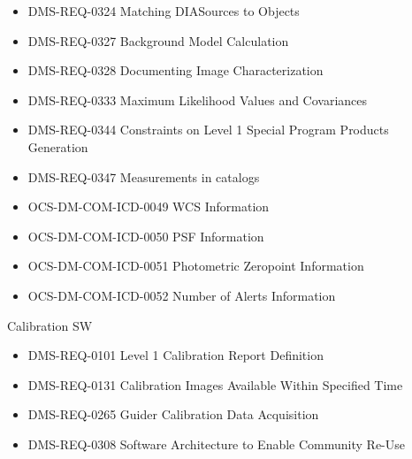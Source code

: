 \begin{itemize}
\item DMS-REQ-0324 Matching DIASources to Objects
\item DMS-REQ-0327 Background Model Calculation
\item DMS-REQ-0328 Documenting Image Characterization
\item DMS-REQ-0333 Maximum Likelihood Values and Covariances
\item DMS-REQ-0344 Constraints on Level 1 Special Program Products Generation
\item DMS-REQ-0347 Measurements in catalogs
\item OCS-DM-COM-ICD-0049 WCS Information
\item OCS-DM-COM-ICD-0050 PSF Information
\item OCS-DM-COM-ICD-0051 Photometric Zeropoint Information
\item OCS-DM-COM-ICD-0052 Number of Alerts Information
\end{itemize}
Calibration SW \begin{itemize}
\item DMS-REQ-0101 Level 1 Calibration Report Definition
\item DMS-REQ-0131 Calibration Images Available Within Specified Time
\item DMS-REQ-0265 Guider Calibration Data Acquisition
\item DMS-REQ-0308 Software Architecture to Enable Community Re-Use
\end{itemize}
